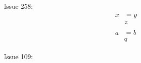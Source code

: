 \documentclass{article}
\begin{document}
Issue 258:
\begin{align}
\begin{split}
x &= y \\
& z
\end{split} \label{eq:1} \\
\begin{split}
a &= b \\
& q
\end{split} \label{eq:2}
\end{align}

Issue 109:
\end{document}
